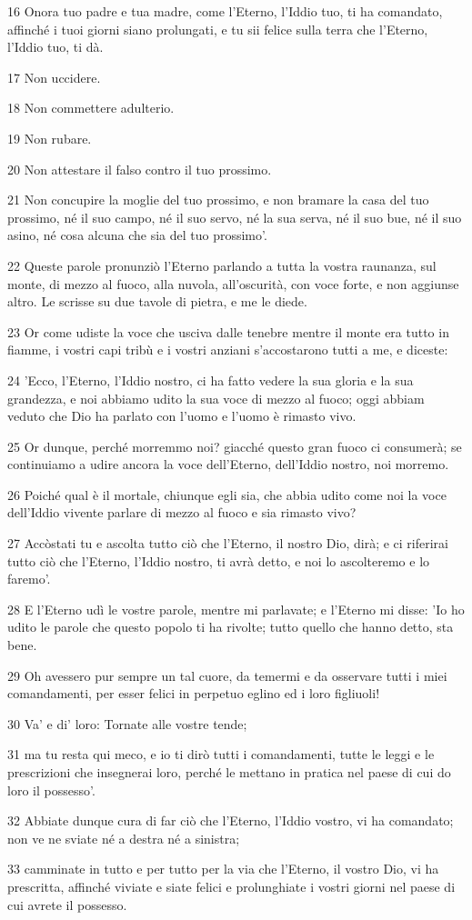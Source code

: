 \par 16 Onora tuo padre e tua madre, come l'Eterno, l'Iddio tuo, ti ha comandato, affinché i tuoi giorni siano prolungati, e tu sii felice sulla terra che l'Eterno, l'Iddio tuo, ti dà.
\par 17 Non uccidere.
\par 18 Non commettere adulterio.
\par 19 Non rubare.
\par 20 Non attestare il falso contro il tuo prossimo.
\par 21 Non concupire la moglie del tuo prossimo, e non bramare la casa del tuo prossimo, né il suo campo, né il suo servo, né la sua serva, né il suo bue, né il suo asino, né cosa alcuna che sia del tuo prossimo'.
\par 22 Queste parole pronunziò l'Eterno parlando a tutta la vostra raunanza, sul monte, di mezzo al fuoco, alla nuvola, all'oscurità, con voce forte, e non aggiunse altro. Le scrisse su due tavole di pietra, e me le diede.
\par 23 Or come udiste la voce che usciva dalle tenebre mentre il monte era tutto in fiamme, i vostri capi tribù e i vostri anziani s'accostarono tutti a me, e diceste:
\par 24 'Ecco, l'Eterno, l'Iddio nostro, ci ha fatto vedere la sua gloria e la sua grandezza, e noi abbiamo udito la sua voce di mezzo al fuoco; oggi abbiam veduto che Dio ha parlato con l'uomo e l'uomo è rimasto vivo.
\par 25 Or dunque, perché morremmo noi? giacché questo gran fuoco ci consumerà; se continuiamo a udire ancora la voce dell'Eterno, dell'Iddio nostro, noi morremo.
\par 26 Poiché qual è il mortale, chiunque egli sia, che abbia udito come noi la voce dell'Iddio vivente parlare di mezzo al fuoco e sia rimasto vivo?
\par 27 Accòstati tu e ascolta tutto ciò che l'Eterno, il nostro Dio, dirà; e ci riferirai tutto ciò che l'Eterno, l'Iddio nostro, ti avrà detto, e noi lo ascolteremo e lo faremo'.
\par 28 E l'Eterno udì le vostre parole, mentre mi parlavate; e l'Eterno mi disse: 'Io ho udito le parole che questo popolo ti ha rivolte; tutto quello che hanno detto, sta bene.
\par 29 Oh avessero pur sempre un tal cuore, da temermi e da osservare tutti i miei comandamenti, per esser felici in perpetuo eglino ed i loro figliuoli!
\par 30 Va' e di' loro: Tornate alle vostre tende;
\par 31 ma tu resta qui meco, e io ti dirò tutti i comandamenti, tutte le leggi e le prescrizioni che insegnerai loro, perché le mettano in pratica nel paese di cui do loro il possesso'.
\par 32 Abbiate dunque cura di far ciò che l'Eterno, l'Iddio vostro, vi ha comandato; non ve ne sviate né a destra né a sinistra;
\par 33 camminate in tutto e per tutto per la via che l'Eterno, il vostro Dio, vi ha prescritta, affinché viviate e siate felici e prolunghiate i vostri giorni nel paese di cui avrete il possesso.

